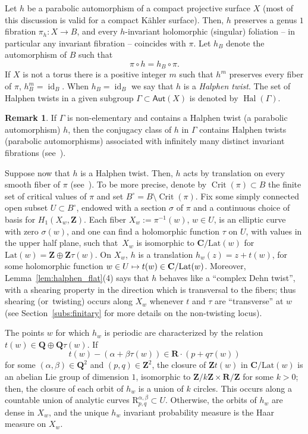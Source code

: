 \documentclass[JEP,XML,SOM,Unicode,published]{cedram}
\newcommand\mto{\mathchoice{\longmapsto}{\mapsto}{\mapsto}{\mapsto}}
\DeclareMathOperator{\Crit}{Crit}
\DeclareMathOperator{\id}{id}
\DeclareMathOperator{\Hal}{Hal}
\def\C{\mathbf{C}}
\def\R{\mathbf{R}}
\def\Q{\mathbf{Q}}
\def\Z{\mathbf{Z}}
\newcommand{\Lat}{{\mathrm{Lat}}}
\newcommand\Aut{\mathsf{Aut}}
\theoremstyle{plain}
\theoremstyle{definition}
\newtheorem{rem}[thm]{Remark}
\begin{document}
Let $h$ be a parabolic automorphism of a compact projective surface $X$ (most of this discussion is valid for a
compact Kähler surface). Then, $h$ preserves a genus $1$ fibration
$\pi_h\colon X\to B$, and every $h$-invariant holomorphic (singular) foliation -- in particular any invariant fibration -- coincides with $\pi$. Let $h_B$ denote the automorphism of $B$ such that
\begin{equation*}
\pi\circ h=h_B\circ \pi.
\end{equation*}
If $X$ is not a torus there is a positive integer $m$ such that $h^m$ preserves every fiber of $\pi$, \ie $h_B^m=\id_B$. When $h_B = \id_B$ we say that $h$ is a \emph{Halphen twist}. The set of Halphen twists in a given subgroup $\Gamma\subset \Aut(X)$ is denoted by $\Hal(\Gamma)$.

\begin{rem}\label{rem:many_parabolic}
If $\Gamma$ is non-elementary and contains a Halphen twist (\resp a parabolic automorphism) $h$, then the conjugacy class of $h$ in $\Gamma$ contains Halphen twists (\resp parabolic automorphisms) associated with infinitely many distinct invariant fibrations (see~\cite[\S 3.1]{finite_orbits}).
\end{rem}

Suppose now that $h$ is a Halphen twist.
Then, $h$ acts by translation on every smooth fiber of $\pi$ (see~\cite[\S 3]{invariant}).
To be more precise, denote by $\Crit(\pi)\subset B$ the finite set of critical values of $\pi$ and set $B^\circ= B\setminus \Crit(\pi)$.
Fix some simply connected open subset $U\subset B^\circ$, endowed with a section $\sigma$ of
$\pi$ and a continuous choice of basis for $H_1(X_w, \Z)$.
Each fiber $X_w:=\pi^{-1}(w)$, $w\in U$, is an elliptic curve with zero $\sigma(w)$, and one can find a holomorphic function $\tau$ on $U$, with values in the upper half plane, such that~$X_w$ is isomorphic to $\C/\Lat(w)$ for $\Lat(w)=\Z\oplus \Z\tau(w)$. On $X_w$, $h$ is a translation $h_w(z)=z+t(w)$, for some holomorphic function $w\in U\mto t(w)\in \C/\Lat(w)$. Moreover, Lemma~\ref{lem:halphen_flat}(4) says that $h$ behaves like a ``complex Dehn twist'', with a shearing property in the direction which is transversal to the fibers; thus shearing (or~twisting) occurs along $X_w$ whenever $t$ and $\tau$ are ``transverse'' at $w$
(see Section~\ref{subs:finitary} for more details on the non-twisting locus).

The points $w$ for which $h_w$ is periodic are characterized by the relation $t(w)\in \Q\oplus \Q\tau(w)$. If
\begin{equation*}
t(w)-(\alpha+\beta\tau(w))\in \R \cdot (p+q\tau(w))
\end{equation*}
for some $(\alpha,\beta)\in \Q^2$ and $(p,q)\in \Z^2$, the closure of $\Z t(w)$ in $\C/\Lat(w)$ is an abelian Lie group of dimension $1$,
isomorphic to $\Z / k\Z \times \R /\Z$ for some $k>0$; then, the closure of each orbit of $h_w$ is a union of $k$ circles. This occurs along a countable union of analytic curves $\mathrm{R}^{\alpha, \beta}_{p, q}\subset U$. Otherwise, the orbits of $h_w$ are dense in $X_w$, and the unique $h_w$ invariant probability
measure is the Haar measure on $X_w$.
\end{document}
